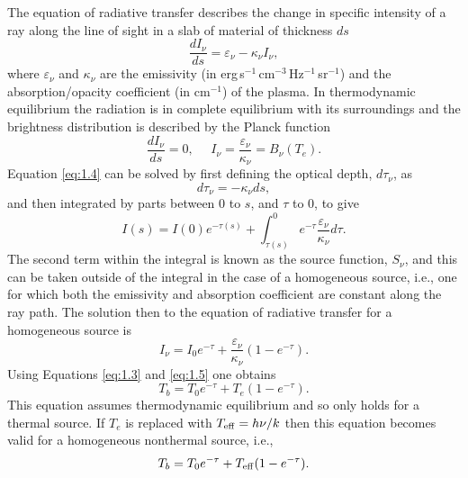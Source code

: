 The equation of radiative transfer describes the change in specific intensity of a ray along the line of sight in a slab of material of thickness $ds$
\begin{equation}\label{eq:1.4}
\frac{dI_{\nu}}{ds}=\varepsilon _{\nu} - \kappa _{\nu}I_{\nu},
\end{equation}
where $\varepsilon _{\nu}$ and $\kappa _{\nu}$ are the emissivity (in erg\,s$^{-1}$\,cm$^{-3}$\,Hz$^{-1}$\,sr$^{-1}$) and the absorption/opacity coefficient (in cm$^{-1}$) of the plasma. In thermodynamic equilibrium the radiation is in complete equilibrium with its surroundings and the brightness distribution is described by the Planck function
\begin{equation}\label{eq:1.5}
\dfrac{dI_{\nu}}{ds}=0, \ \ \ \ \ \ I_{\nu}= \frac{\varepsilon _{\nu}}{\kappa _{\nu}}=B_{\nu}(T_e).
\end{equation}
Equation \ref{eq:1.4} can be solved by first defining the optical depth, $d\tau _{\nu}$, as
\begin{equation}
d\tau _{\nu}=-\kappa _{\nu}ds,
\end{equation}
and then integrated by parts between 0 to $s$, and $\tau$ to 0, to give 
\begin{equation}
I(s) = I(0)e^{-\tau(s)} + \int ^0 _{\tau (s)}e^{-\tau} \frac{\varepsilon _{\nu}}{\kappa _{\nu}}d\tau.
\end{equation}
The second term within the integral is known as the source function, $S_{\nu}$, and this can be taken outside of the integral in the case of a homogeneous source, i.e., one for which both the emissivity and absorption coefficient are constant along the ray path. The solution then to the equation of radiative transfer for a homogeneous source is
\begin{equation}\label{eq:1.9}
I_{\nu} = I_{0}e^{-\tau} + \frac{\varepsilon _{\nu}}{\kappa _{\nu}}(1 - e^{-\tau}).
\end{equation}
Using Equations \ref{eq:1.3} and \ref{eq:1.5} one obtains
\begin{equation}
T_{b} = T_{0}e^{-\tau} + T_{e}(1 - e^{-\tau}).
\end{equation}
This equation assumes thermodynamic equilibrium and so only holds for a thermal source. If $T_{e}$ is replaced with $T_{\rm{eff}} = h\nu/k$  then this equation becomes valid for a homogeneous nonthermal source, i.e.,
\begin{equation}
T_{b} = T_{0}e^{-\tau} + T_{\rm{eff}}(1 - e^{-\tau}).
\end{equation}
